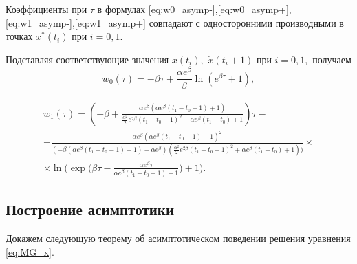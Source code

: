 \begin{remark}
	Коэффициенты при $\tau$ в формулах \eqref{eq:w0_asymp-},\eqref{eq:w0_asymp+},\eqref{eq:w1_asymp-},\eqref{eq:w1_asymp+} совпадают с односторонними производными в точках $x^*(t_i)$ при $i = 0, 1$. 
\end{remark}

Подставляя соответствующие значения $x(t_i),$ $\dot{x}(t_i + 1)$ при $i = 0, 1,$ получаем
\begin{equation}
	\label{eq:w0}
	w_0(\tau)=-\beta \tau+\frac{\alpha e^\beta}{\beta}\ln(e^{\beta\tau}+1),
\end{equation}

\begin{multline}
	\label{eq:w1}
	w_1(\tau)=\left(-\beta + \frac{\alpha e^\beta(\alpha e^\beta(t_1-t_0-1)+1)}{\frac{\alpha^2}{2}e^{2\beta}(t_1-t_0-1)^2+\alpha e^{\beta}(t_1-t_0) + 1}\right)\tau -\\- \frac{\alpha e^\beta(\alpha e^\beta(t_1-t_0-1)+1)^2}{(-\beta(\alpha e^\beta(t_1-t_0-1)+1)+\alpha e^\beta)(\frac{\alpha^2}{2}e^{2\beta}(t_1-t_0-1)^2+\alpha e^{\beta}(t_1-t_0)+1))}\times
	\\ \times\ln\Bigg(\exp\Big(\beta\tau-\frac{\alpha e^\beta\tau}{\alpha e^\beta(t_1-t_0-1)+1}\Big)+1\Bigg).
\end{multline}

\subsection{Построение асимптотики}

Докажем следующую теорему об асимптотическом поведении решения уравнения \eqref{eq:MG_x}.

